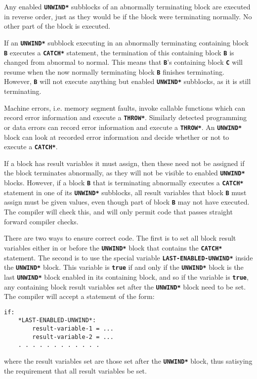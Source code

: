 \documentclass[12pt]{article}
\makeatletter
\newcommand{\TT}[1]{{\tt \bfseries #1}}
\newcommand{\ttkey}[1]{\TT{#1}\index{#1@{\tt #1}}}
\newenvironment{indpar}[1][0.3in]%
	{\begin{list}{}%
		     {\setlength{\itemsep}{0in}%
		      \setlength{\topsep}{0in}%
		      \setlength{\parsep}{1ex}%
		      \setlength{\labelwidth}{#1}%
		      \setlength{\leftmargin}{#1}%
		      \addtolength{\leftmargin}{\labelsep}}%
	 \item}%
	{\end{list}}
\makeatother
\begin{document}
Any enabled \TT{*UNWIND*} subblocks of an abnormally terminating
block are executed in reverse order, just as they would be if
the block were terminating normally.  No other part of the block
is executed.

If an \TT{*UNWIND*} subblock executing in an abnormally terminating
containing block \TT{B}
executes a \TT{*CATCH*} statement, the termination of this
containing block \TT{B}
is changed from abnormal to normal.  This means
that \TT{B}'s containing block \TT{C} will resume when the now
normally terminating block \TT{B} finishes terminating.
However, \TT{B} will not execute anything but enabled \TT{*UNWIND*}
subblocks, as it is still terminating.

Machine errors, i.e. memory segment faults, invoke callable functions
which can record error information and execute a \TT{*THROW*}.
Similarly detected programming or data errors can record
error information and execute a \TT{*THROW*}.  An \TT{*UNWIND*}
block can look at recorded error information and decide whether
or not to execute a \TT{*CATCH*}.

If a block has result variables it must assign, then these need not be
assigned if the block terminates abnormally, as they will not
be visible to enabled \TT{*UNWIND*} blocks.  However, if a block \TT{B}
that is terminating abnormally executes a \TT{*CATCH*} statement in
one of its \TT{*UNWIND*} subblocks,
all result variables that block \TT{B} must assign must be given values, even
though part of block \TT{B} may not have executed.  The compiler
will check this, and will only permit code that passes straight forward
compiler checks.

There are two ways to ensure correct code.  The first is to 
set all block result variables either in or before the
\TT{*UNWIND*} block that contains the \TT{*CATCH*} statement.
The second is to use the special variable
\ttkey{*LAST-ENABLED-UNWIND*} inside the \TT{*UNWIND*} block.
This variable is \TT{true} if and only if the \TT{*UNWIND*}
block is the last \TT{*UNWIND*} block enabled in its containing
block, and so if the variable is \TT{true}, any containing
block result variables set after the \TT{*UNWIND*} block need to be
set.  The compiler will accept a statement of the form:
\begin{indpar}\begin{verbatim}
if:
    *LAST-ENABLED-UNWIND*:
        result-variable-1 = ...
        result-variable-2 = ...
	. . . . . . . . . . . .
\end{verbatim}\end{indpar}
where the result variables set are those set after the \TT{*UNWIND*}
block, thus satisying the requirement that all result variables be set.
\end{document}

